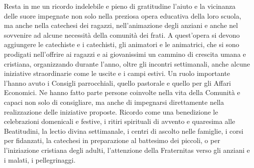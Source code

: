 Resta in me un ricordo indelebile e pieno di gratitudine l’aiuto e la vicinanza delle suore 
impegnate non solo nella preziosa opera educativa della loro scuola, ma anche nella catechesi dei 
ragazzi, nell’animazione degli anziani e anche nel sovvenire ad alcune necessità della comunità 
dei frati. A quest’opera si devono aggiungere le catechiste e i catechisti, gli animatori e le 
animatrici, che si sono prodigati nell’offrire ai ragazzi e ai giovanissimi un cammino di crescita 
umana e cristiana, organizzando durante l’anno, oltre gli incontri settimanali, anche alcune 
iniziative straordinarie come le uscite e i campi estivi.
\medbreak
Un ruolo importante l’hanno avuto i Consigli parrocchiali, quello pastorale e quello per gli Affari 
Economici. Ne hanno fatto parte persone coinvolte nella vita della Comunità e capaci non solo di 
consigliare, ma anche di impegnarsi direttamente nella realizzazione delle iniziative proposte. 
Ricordo come una benedizione le celebrazioni domenicali e festive, i ritiri spirituali di avvento e 
quaresima alle Beatitudini, la lectio divina settimanale, i centri di ascolto nelle famiglie, i corsi 
per fidanzati, la catechesi in preparazione al battesimo dei piccoli, o per l’iniziazione cristiana 
degli adulti, l’attenzione della Fraternitas verso gli anziani e i malati, i pellegrinaggi.

